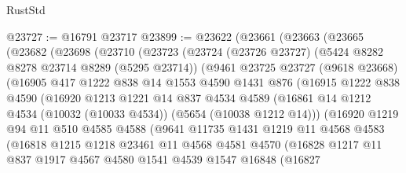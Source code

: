 \begin{lexlean}{RustStd}
\begin{coremodule}
@23727 := @16791 @23717
@23899 := @23622
    (@23661
      (@23663
        (@23665
          (@23682
            (@23698
              (@23710
                (@23723
                  (@23724
                    (@23726 @23727)
                    (@5424 @8282 @8278 @23714 @8289 (@5295 @23714))
                    (@9461
                      @23725
                      @23727
                      (@9618 @23668)
                      (@16905
                        @417
                        @1222
                        @838
                        @14
                        @1553
                        @4590
                        @1431
                        @876
                        (@16915
                          @1222
                          @838
                          @4590
                          (@16920
                            @1213
                            @1221
                            @14
                            @837
                            @4534
                            @4589
                            (@16861
                              @14
                              @1212
                              @4534
                              (@10032 (@10033 @4534))
                              (@5654 (@10038 @1212 @14)))
                            (@16920
                              @1219
                              @94
                              @11
                              @510
                              @4585
                              @4588
                              (@9641
                                @11735
                                @1431
                                @1219
                                @11
                                @4568
                                @4583
                                (@16818
                                  @1215
                                  @1218
                                  @23461
                                  @11
                                  @4568
                                  @4581
                                  @4570
                                  (@16828
                                    @1217
                                    @11
                                    @837
                                    @1917
                                    @4567
                                    @4580
                                    @1541
                                    @4539
                                    @1547
                                    @16848
                                    (@16827

\end{coremodule}
\end{lexlean}
